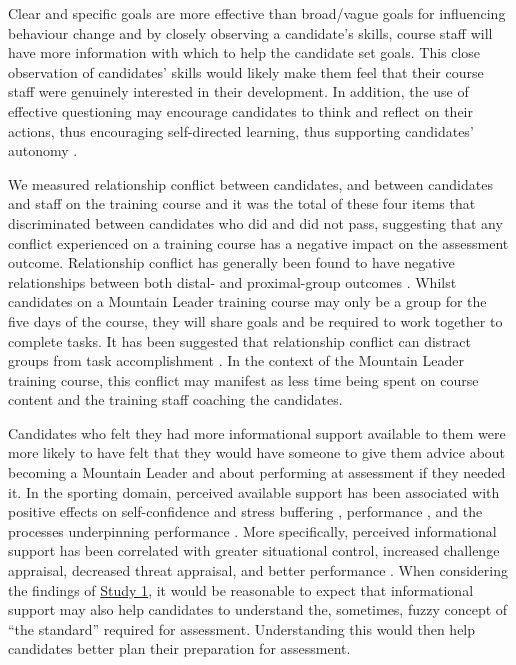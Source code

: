 \documentclass[
  12pt,
  a4paper,
]{book}
\begin{document}
Clear and specific goals are more effective than broad/vague goals for influencing behaviour change \citep{Gould2005} and by closely observing a candidate's skills, course staff will have more information with which to help the candidate set goals. This close observation of candidates' skills would likely make them feel that their course staff were genuinely interested in their development. In addition, the use of effective questioning may encourage candidates to think and reflect on their actions, thus encouraging self-directed learning, thus supporting candidates' autonomy \citep{Wagstaff2018}.

We measured relationship conflict between candidates, and between candidates and staff on the training course and it was the total of these four items that discriminated between candidates who did and did not pass, suggesting that any conflict experienced on a training course has a negative impact on the assessment outcome. Relationship conflict has generally been found to have negative relationships between both distal- and proximal-group outcomes \citep[see][]{deWit2012}. Whilst candidates on a Mountain Leader training course may only be a group for the five days of the course, they will share goals and be required to work together to complete tasks. It has been suggested that relationship conflict can distract groups from task accomplishment \citep{Evan1965, Jehn1995}. In the context of the Mountain Leader training course, this conflict may manifest as less time being spent on course content and the training staff coaching the candidates.

Candidates who felt they had more informational support available to them were more likely to have felt that they would have someone to give them advice about becoming a Mountain Leader and about performing at assessment if they needed it. In the sporting domain, perceived available support has been associated with positive effects on self-confidence and stress buffering \citep{Rees2007}, performance \citep{Freeman2009}, and the processes underpinning performance \citep{Rees1999}. More specifically, perceived informational support has been correlated with greater situational control, increased challenge appraisal, decreased threat appraisal, and better performance \citep{Freeman2009}. When considering the findings of \protect\hyperlink{ml-qualitative}{Study 1}, it would be reasonable to expect that informational support may also help candidates to understand the, sometimes, fuzzy concept of ``the standard'' required for assessment. Understanding this would then help candidates better plan their preparation for assessment.
\end{document}
